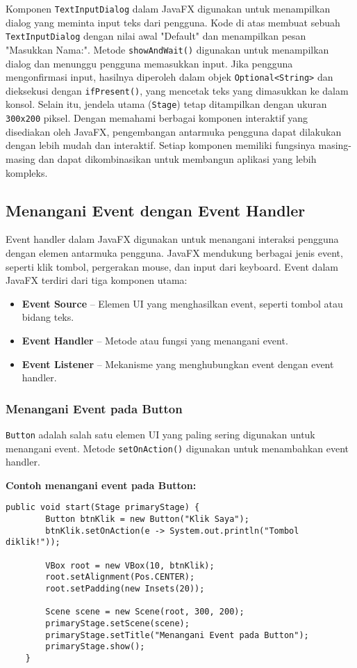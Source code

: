 Komponen \texttt{TextInputDialog} dalam JavaFX digunakan untuk menampilkan dialog yang meminta input teks dari pengguna. Kode di atas membuat sebuah \texttt{TextInputDialog} dengan nilai awal "Default" dan menampilkan pesan "Masukkan Nama:". Metode \texttt{showAndWait()} digunakan untuk menampilkan dialog dan menunggu pengguna memasukkan input. Jika pengguna mengonfirmasi input, hasilnya diperoleh dalam objek \texttt{Optional<String>} dan dieksekusi dengan \texttt{ifPresent()}, yang mencetak teks yang dimasukkan ke dalam konsol. Selain itu, jendela utama (\texttt{Stage}) tetap ditampilkan dengan ukuran \texttt{300x200} piksel. Dengan memahami berbagai komponen interaktif yang disediakan oleh JavaFX, pengembangan antarmuka pengguna dapat dilakukan dengan lebih mudah dan interaktif. Setiap komponen memiliki fungsinya masing-masing dan dapat dikombinasikan untuk membangun aplikasi yang lebih kompleks.


\subsection{Menangani Event dengan Event Handler}

Event handler dalam JavaFX digunakan untuk menangani interaksi pengguna dengan elemen antarmuka pengguna. JavaFX mendukung berbagai jenis event, seperti klik tombol, pergerakan mouse, dan input dari keyboard. Event dalam JavaFX terdiri dari tiga komponen utama:

\begin{itemize}
\item \textbf{Event Source} – Elemen UI yang menghasilkan event, seperti tombol atau bidang teks.
\item \textbf{Event Handler} – Metode atau fungsi yang menangani event.
\item \textbf{Event Listener} – Mekanisme yang menghubungkan event dengan event handler.
\end{itemize}

\subsubsection{Menangani Event pada Button}

\texttt{Button} adalah salah satu elemen UI yang paling sering digunakan untuk menangani event. Metode \texttt{setOnAction()} digunakan untuk menambahkan event handler.

\textbf{Contoh menangani event pada Button:}
\begin{lstlisting}[style=JavaStyle, caption=Menangani klik tombol dalam JavaFX]
	public void start(Stage primaryStage) {
		Button btnKlik = new Button("Klik Saya");
		btnKlik.setOnAction(e -> System.out.println("Tombol diklik!"));
		
		VBox root = new VBox(10, btnKlik);
		root.setAlignment(Pos.CENTER);
		root.setPadding(new Insets(20));
		
		Scene scene = new Scene(root, 300, 200);
		primaryStage.setScene(scene);
		primaryStage.setTitle("Menangani Event pada Button");
		primaryStage.show();
	}
\end{lstlisting}

